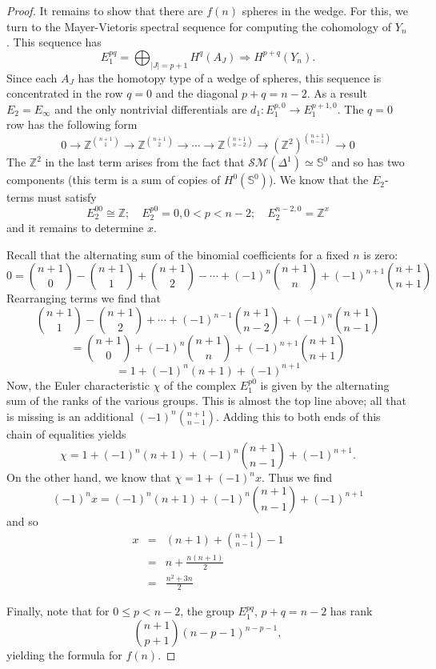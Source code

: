 \documentclass{amsart}
\theoremstyle{definition}
\newcommand{\zz}{{\mathbb Z}}
\newcommand{\zs}{{\mathbb S}}
\newcommand{\sm}{{\mathcal{SM}}}
\begin{document}
\begin{proof}
    It remains to show that there are $f(n)$ spheres in the wedge. For this, we turn to the Mayer-Vietoris spectral sequence for computing the cohomology of $Y_n$. This sequence has
    $$E_1^{pq} = \bigoplus_{|J|=p+1} H^q(A_J)\Longrightarrow H^{p+q}(Y_n).$$ Since each $A_J$ has the homotopy type of a wedge of spheres, this sequence is concentrated in the row $q=0$ and the diagonal $p+q=n-2$. As a result $E_2=E_\infty$ and the only nontrivial differentials are $d_1:E_1^{p,0}\to E_1^{p+1,0}$. The $q=0$ row has the following form
    $$0\to \zz^{\binom{n+1}{1}} \to \zz^{\binom{n+1}{2}}\to \cdots \to \zz^{\binom{n+1}{n-2}}\to (\zz^2)^{\binom{n+1}{n-1}}\to 0$$
    The $\zz^2$ in the last term arises from the fact that $\sm(\Delta^1)\simeq \zs^0$ and so has two components (this term is a sum of copies of $H^0(\zs^0)$). We know that the $E_2$-terms must satisfy
    $$E_2^{00}\cong\zz;\quad E_2^{p0}=0, 0<p<n-2;\quad E_2^{n-2,0}=\zz^x$$ and it remains to determine $x$. 

    Recall that the alternating sum of the binomial coefficients for a fixed $n$ is zero:
    $$0=\binom{n+1}{0} - \binom{n+1}{1} +\binom{n+1}{2}-\cdots + (-1)^n\binom{n+1}{n} + (-1)^{n+1}\binom{n+1}{n+1}$$
    Rearranging terms we find that
    $$\binom{n+1}{1}-\binom{n+1}{2}+\cdots+(-1)^{n-1}\binom{n+1}{n-2} +(-1)^n\binom{n+1}{n-1} $$
    $${}=\binom{n+1}{0} + (-1)^n\binom{n+1}{n} + (-1)^{n+1}\binom{n+1}{n+1}$$
    $${}=1+(-1)^n(n+1) +(-1)^{n+1}$$
    Now, the Euler characteristic $\chi$ of the complex $E_1^{p0}$ is given by the alternating sum of the ranks of the various groups. This is almost the top line above; all that is missing is an additional $(-1)^n\binom{n+1}{n-1}$. Adding this to both ends of this chain of equalities yields
    $$\chi = 1+(-1)^n(n+1) +(-1)^n\binom{n+1}{n-1} + (-1)^{n+1}.$$
    On the other hand, we know that $\chi = 1+(-1)^nx$. Thus we find
        $$(-1)^nx  =  (-1)^n(n+1) + (-1)^n\binom{n+1}{n-1} + (-1)^{n+1}$$ and so 
    \begin{eqnarray*}
        x & = & (n+1) + \binom{n+1}{n-1} - 1 \\
           & = & n + \frac{n(n+1)}{2} \\
           & = & \frac{n^2 + 3n}{2}
    \end{eqnarray*}

    Finally, note that for $0\le p <n-2$, the group $E_1^{pq}$, $p+q=n-2$ has rank $$\binom{n+1}{p+1}(n-p-1)^{n-p-1},$$ yielding the formula for $f(n)$.
    
\end{proof} 
\end{document}
